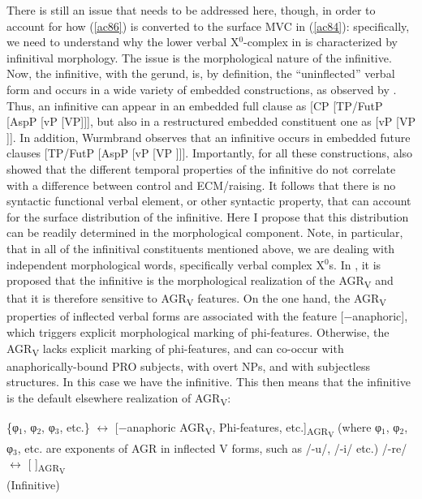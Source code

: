 \documentclass[output=paper]{langscibook}
\begin{document}
There is still an issue that needs to be addressed here, though, in order to account for how (\ref{ac86}) is converted to the surface MVC in (\ref{ac84}): specifically, we need to understand why the lower verbal X$^0$-complex in  is characterized by infinitival morphology. The issue is the morphological nature of the infinitive. Now, the infinitive, with the gerund, is, by definition, the “uninflected” verbal form and occurs in a wide variety of embedded constructions, as observed by \citet{wurmbrand2014a}.  Thus, an infinitive can appear in an embedded full clause as [CP [TP/FutP [AspP [vP [VP]]], but also in a restructured embedded constituent one as [vP [VP ]].  In addition, Wurmbrand observes that an infinitive occurs in embedded future clauses  [TP/FutP [AspP [vP [VP ]]]. Importantly, for all these constructions, \citet{wurmbrand2014a} also showed that the different temporal properties of the infinitive do not correlate with a difference between control and ECM/raising. It follows that there is no syntactic functional verbal element, or other syntactic property, that can account for the surface distribution of the infinitive. Here I propose that this distribution can be readily determined in the morphological component. Note, in particular, that in all of the infinitival constituents mentioned above, we are dealing with independent morphological words, specifically verbal complex X$^0$s. In \citet{calabrese1993a}, it is proposed that the infinitive is the morphological realization of the  AGR\textsubscript{V} and that it is therefore sensitive to  AGR\textsubscript{V} features. On the one hand, the  AGR\textsubscript{V} properties of inflected verbal forms are associated with the feature [−anaphoric], which triggers explicit morphological marking of phi-features.  Otherwise, the  AGR\textsubscript{V} lacks explicit marking of phi-features, and can co-occur with anaphorically-bound PRO subjects, with overt NPs, and with subjectless structures. In this case we have the infinitive. This then means that the infinitive is the default elsewhere realization of AGR\textsubscript{V}:

\ea\label{ac89}
    \ea \label{ac89a}\{φ$_1$, φ$_2$, φ$_3$, etc.\} $\longleftrightarrow$ [−anaphoric  AGR\textsubscript{V}, Phi-features, etc.]\textsubscript{AGR\textsubscript{V}}
       (where φ$_1$, φ$_2$, φ$_3$, etc. are exponents of AGR in inflected V forms, such as /-u/, /-i/ etc.)
    \ex \label{ac89b}/-re/ $\longleftrightarrow$  [   ]\textsubscript{AGR\textsubscript{V}}\\(Infinitive)
    \z
\z
\end{document}

